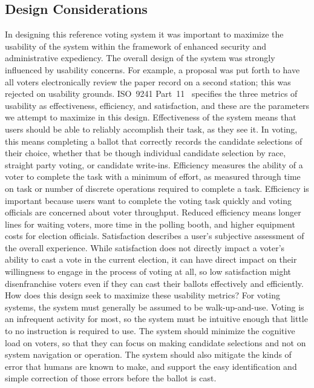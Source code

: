 \subsection{Design Considerations}
In designing this reference voting system it was important to maximize
the usability of the system within the framework of enhanced security
and administrative expediency. The overall design of the system was
strongly influenced by usability concerns. For example, a proposal was
put forth to have all voters electronically review the paper record on a
second station; this was rejected on usability grounds. ISO~9241
Part~11~\cite{iso1998} specifies the three metrics of usability as
effectiveness, efficiency, and satisfaction, and these are the
parameters we attempt to maximize in this design. Effectiveness of the
system means that users should be able to reliably accomplish their
task, as they see it. In voting, this means completing a ballot that
correctly records the candidate selections of their choice, whether that
be though individual candidate selection by race, straight party voting,
or candidate write-ins. Efficiency measures the ability of a voter to
complete the task with a minimum of effort, as measured through time on
task or number of discrete operations required to complete a task.
Efficiency is important because users want to complete the voting task
quickly and voting officials are concerned about voter throughput.
Reduced efficiency means longer lines for waiting voters, more time in
the polling booth, and higher equipment costs for election officials.
Satisfaction describes a user's subjective assessment of the overall
experience. While satisfaction does not directly impact a voter's
ability to cast a vote in the current election, it can have direct
impact on their willingness to engage in the process of voting at all,
so low satisfaction might disenfranchise voters even if they can cast
their ballots effectively and efficiently. How does this design seek to
maximize these usability metrics? For voting systems, the system must
generally be assumed to be walk-up-and-use. Voting is an infrequent
activity for most, so the system must be intuitive enough that little to
no instruction is required to use. The system should minimize the
cognitive load on voters, so that they can focus on making candidate
selections and not on system navigation or operation. The system should
also mitigate the kinds of error that humans are known to make, and
support the easy identification and simple correction of those errors
before the ballot is cast.

